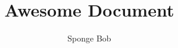 \documentclass{article}
\author{Sponge Bob}
\title{Awesome Document}
\begin{document}
\maketitle

\lipsum
\end{document}
